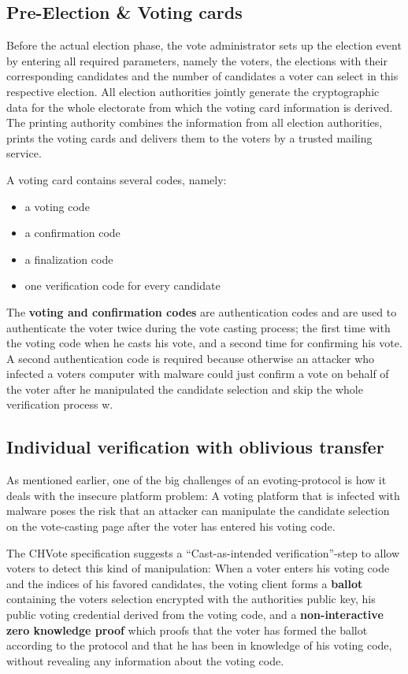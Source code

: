 \subsection{Pre-Election \& Voting cards}
Before the actual election phase, the vote administrator sets up the election event by entering all required parameters, namely the voters, the elections with their corresponding candidates and the number of candidates a voter can select in this respective election. All election authorities jointly generate the cryptographic data for the whole electorate from which the voting card information is derived. The printing authority combines the information from all election authorities, prints the voting cards and delivers them to the voters by a trusted mailing service. 

A voting card contains several codes, namely:

\begin{itemize}
	\item a voting code
	\item a confirmation code
	\item a finalization code
	\item one verification code for every candidate
\end{itemize}

The \textbf{voting and confirmation codes} are authentication codes and are used to authenticate the voter twice during the vote casting process; the first time with the voting code when he casts his vote, and a second time for confirming his vote. A second authentication code is required because otherwise an attacker who infected a voters computer with malware could just confirm a vote on behalf of the voter after he manipulated the candidate selection and skip the whole verification process w. 

\subsection{Individual verification with oblivious transfer}
As mentioned earlier, one of the big challenges of an evoting-protocol is how it deals with the insecure platform problem: A voting platform that is infected with malware poses the risk that an attacker can manipulate the candidate selection on the vote-casting page after the voter has entered his voting code. 

The CHVote specification suggests a "`Cast-as-intended verification"'-step to allow voters to detect this kind of manipulation: When a voter enters his voting code and the indices of his favored candidates, the voting client forms a \textbf{ballot} containing the voters selection encrypted with the authorities public key, his public voting credential derived from the voting code, and a \textbf{non-interactive zero knowledge proof} which proofs that the voter has formed the ballot according to the protocol and that he has been in knowledge of his voting code, without revealing any information about the voting code.

